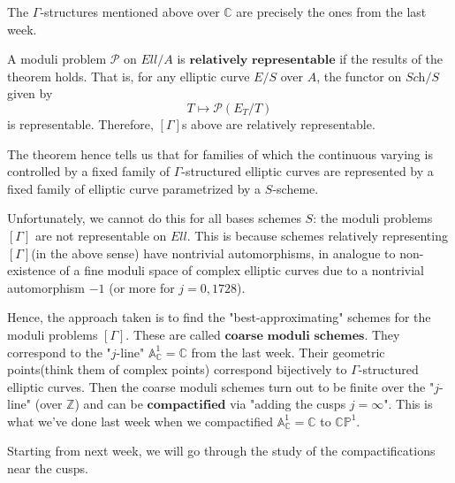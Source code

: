 \documentclass[a4paper,11pt]{article}
\begin{document}
\begin{rem}
The $\Gamma$-structures mentioned above over $\mathbb{C}$ are precisely the ones from the last week.
\end{rem}

\begin{defn}
A moduli problem $\mathcal{P}$ on $Ell/A$ is $\textbf{relatively representable}$ if the results of the theorem holds.
That is, for any elliptic curve $E/S$ over $A$, the functor on $\textit{Sch}/S$ given by
\[
T \mapsto \mathcal{P}(E_T/T)
\]
is representable.
Therefore, $[\Gamma]$s above are relatively representable.
\end{defn}

The theorem hence tells us that for families of which the continuous varying is controlled by a fixed family of $\Gamma$-structured elliptic curves are represented by a fixed family of elliptic curve parametrized by a $S$-scheme.

Unfortunately, we cannot do this for all bases schemes $S$: the moduli problems $[\Gamma]$ are not representable on $Ell$.
This is because schemes relatively representing $[\Gamma]$(in the above sense) have nontrivial automorphisms, in analogue to non-existence of a fine moduli space of complex elliptic curves due to a nontrivial automorphism $-1$ (or more for $j=0,1728$).

Hence, the approach taken is to find the "best-approximating" schemes for the moduli problems $[\Gamma]$.
These are called $\textbf{coarse moduli schemes}$.
They correspond to the "$j$-line" $\mathbb{A}^1_{\mathbb{C}}=\mathbb{C}$ from the last week.
Their geometric points(think them of complex points) correspond bijectively to $\Gamma$-structured elliptic curves.
Then the coarse moduli schemes turn out to be finite over the "$j$-line" (over $\mathbb{Z}$) and can be $\textbf{compactified}$ via "adding the cusps $j=\infty$".
This is what we've done last week when we compactified $\mathbb{A}^1_{\mathbb{C}}=\mathbb{C}$ to $\mathbb{C}\mathbb{P}^1$.

Starting from next week, we will go through the study of the compactifications near the cusps.
\end{document}
